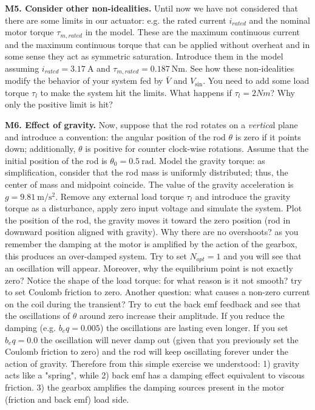 \documentclass[11pt]{article}
\begin{document}
%
%
\par
\textbf{M5. Consider other non-idealities.} 
Until now we have not considered that there are some limits in our actuator: e.g. the rated 
current $i_{rated}$ and the nominal motor torque $\tau_{m, rated}$ in the model. 
These are the maximum continuous current and the 
maximum continuous torque that can be applied without overheat and 
in some sense they act as symmetric saturation. Introduce them in the model 
assuming $i_{rated} = 3.17 \ \mathrm{A}$ and $\tau_{m, rated} = 0.187 \ \mathrm{Nm}$. 
See how these non-idealities modify the behavior of your system fed by $\bar{V}$ and $V_{\sin}$.
You need to add some load torque $\tau_l$ to make the system hit the limits. What happens if $\tau_l = 2Nm$?
Why only the positive limit is hit?
%
%
\par
\textbf{M6. Effect of gravity.} 
Now, suppose that the rod rotates on a \textit{vertica}l plane and introduce a convention: the angular 
position of the rod $\theta$ is zero if it points down; additionally, $\theta$ is positive for counter clock-wise rotations. 
Assume that the initial position of the rod is $\theta_0 = 0.5 \ \mathrm{rad}$. 
Model the gravity torque: as simplification, consider that the rod mass is uniformly distributed; thus, 
the center of mass and midpoint coincide. The value of the gravity acceleration is $g = 9.81 \ \mathrm{m/s^2}$. 
Remove any external load torque $\tau_l$ and introduce the gravity torque as a 
disturbance, apply zero input voltage and simulate the system. 
Plot the position of the rod, the gravity moves it toward the zero position (rod in downward position aligned with gravity). 
Why there are no overshoots? as you remember the damping at the motor is amplified by the action of the gearbox, this 
produces an over-damped system. Try to set $N_{opt} = 1$ and you will see that an oscillation will appear. 
Moreover, why the equilibrium point is not exactly zero? Notice the shape of the load torque: 
for what reason is it not smooth? try to set Coulomb friction to zero.
Another question: what causes a non-zero current on the coil during the transient? %
Try to cut the back emf feedback and see that  the oscillations  of $\theta$  around zero increase their amplitude. %
If you reduce the damping (e.g. $b_eq = 0.005$) the oscillations are lasting even longer. 
If you set  $b_eq = 0.0$ the oscillation will never damp out (given that you previously set the Coulomb friction to zero) 
and the rod will keep oscillating forever under  the action of gravity. 
Therefore from this simple exercise we understood: 1) gravity acts like a "spring", while 2) back emf has a damping effect equivalent to  viscous friction. 
3) the gearbox amplifies the damping sources present in the motor (friction and back emf) load side.
%
\end{document}
